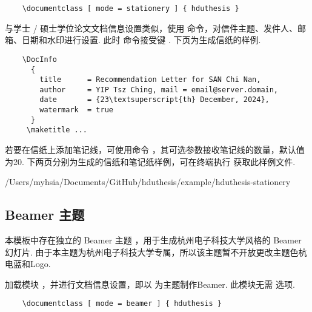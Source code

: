 \begin{framed}
  \begin{verbatim}
    \documentclass [ mode = stationery ] { hduthesis }
  \end{verbatim}
\end{framed}

与学士 / 硕士学位论文文档信息设置类似，使用  命令，对信件主题、发件人、邮箱、日期和水印进行设置. 此时  命令接受键
  
 . 下页为生成信纸的样例.

\begin{framed}
  \begin{verbatim}
    \DocInfo
      {
        title      = Recommendation Letter for SAN Chi Nan,
        author     = YIP Tsz Ching, mail = email@server.domain,
        date       = {23\textsuperscript{th} December, 2024},
        watermark  = true
      }
     \maketitle ... 
  \end{verbatim}
\end{framed}

若要在信纸上添加笔记线，可使用命令 ，其可选参数接收笔记线的数量，默认值为20. 下两页分别为生成的信纸和笔记纸样例，可在终端执行  获取此样例文件.


  {/Users/myhsia/Documents/GitHub/hduthesis/example/hduthesis-stationery}

\subsection{Beamer 主题}

本模板中存在独立的 Beamer 主题 ，用于生成杭州电子科技大学风格的 Beamer 幻灯片. 由于本主题为杭州电子科技大学专属，所以该主题暂不开放更改主题色杭电蓝和Logo.

加载模块 ，并进行文档信息设置，即以  为主题制作Beamer.
此模块无需  选项.

\begin{framed}
  \begin{verbatim}
    \documentclass [ mode = beamer ] { hduthesis }
  \end{verbatim}
\end{framed}

